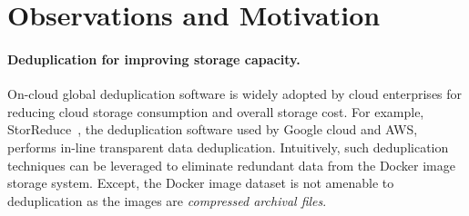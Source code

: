 \section{Observations and Motivation} %
\label{sec:background}

\paragraph{Deduplication for improving storage capacity.}

On-cloud global deduplication software is widely adopted by cloud enterprises for reducing cloud storage consumption and overall storage cost. 
For example, StorReduce~\cite{storReduce}, the deduplication software used by
Google cloud and AWS, 
performs in-line transparent data deduplication. 
Intuitively, such deduplication techniques can be leveraged to eliminate redundant data from the Docker image storage system.  
Except, the Docker image dataset is not amenable to deduplication 
as the images are \emph{compressed archival files}.


